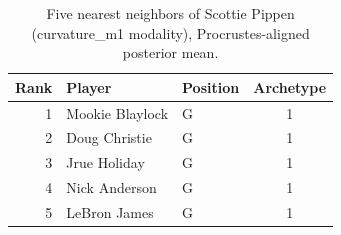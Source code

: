 \begin{table}[htbp]
  \centering\small
  \begin{tabular}{rllc}
    \toprule
    Rank & Player & Position & Archetype \\
    \midrule
    1 & Mookie Blaylock & G & 1 \\
    2 & Doug Christie & G & 1 \\
    3 & Jrue Holiday & G & 1 \\
    4 & Nick Anderson & G & 1 \\
    5 & LeBron James & G & 1 \\
    \bottomrule
  \end{tabular}
  \caption{Five nearest neighbors of Scottie Pippen (curvature_m1 modality), Procrustes-aligned posterior mean.}
  \label{tab:Scottie_Pippen_neighbors_curvature_m1}
\end{table}

